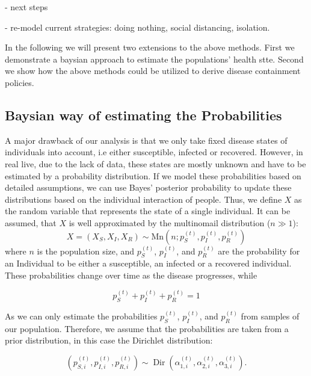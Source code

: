 - next steps

- re-model current strategies: doing nothing, social distancing, isolation.

In the following we will present two extensions to the above methods.
First we demonstrate a baysian approach to estimate the populations' health stte.
Second we show how the above methods could be utilized to derive disease containment policies.

\subsection{Baysian way of estimating the Probabilities}

A major drawback of our analysis is that we only take fixed disease states of individuals into account, i.e either susceptible, infected or recovered. However, in real live, due to the lack of data, these states are mostly unknown and have to be estimated by a probability distribution. If we model these probabilities based on detailed assumptions, we can use Bayes' posterior probability to update these distributions based on the individual interaction of people. Thus, we define $X$ as the random variable that represents the state of a single individual. It can be assumed, that $X$ is well approximated by the multinomail distribution ($n\gg1$):
\begin{equation}
    X = \left(X_{S}, X_{I}, X_{R}\right) \sim \text{Mn}(n;p_S^{(t)},p_I^{(t)},p_R^{(t)})
\end{equation}
where $n$ is the population size, and $p_S^{(t)}$, $p_I^{(t)}$, and $p_R^{(t)}$ are the probability for an Individual to be either a susceptible, an infected or a recovered individual. These probabilities change over time as the disease progresses, while

\begin{equation}
    p_S^{(t)}+p_I^{(t)}+p_R^{(t)}=1
\end{equation}

As we can only estimate the probabilities $p_S^{(t)}$, $p_I^{(t)}$, and $p_R^{(t)}$ from samples of our population. Therefore, we assume that the probabilities are taken from a prior distribution, in this case the Dirichlet distribution:

\begin{equation}
    \left(p_{S,i}^{(t)}, p_{I,i}^{(t)}, p_{R,i}^{(t)}\right) \sim \operatorname{Dir}\left(\alpha_{1,i}^{(t)}, \alpha_{2,i}^{(t)}, \alpha_{3,i}^{(t)}\right).
\end{equation}

